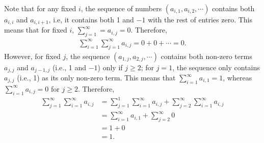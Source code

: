 \documentclass[12pt]{article}
\begin{document}
\begin{fproof}[3(a)]
 Note that for any fixed \(i\), the sequence of numbers \((a_{i,1}, a_{i,2}, \cdots)\) contains both \(a_{i,i}\) and \(a_{i,i+1}\), i.e, it contains both 1 and \(-1\) with the rest of entries zero.
 This means that for fixed \(i\), \(\sum_{j=1}^{\infty} = a_{i,j} = 0\).
 Therefore,
 \begin{align*}
    \sum_{i=1}^{\infty} \sum_{j=1}^{\infty} a_{i,j} = 0 + 0 + \cdots = 0.
 \end{align*}
 However, for fixed \(j\), the sequence \((a_{1,j}, a_{2,j}, \cdots)\) contains both non-zero terms \(a_{j,j}\) and \(a_{j-1,j}\) (i.e., 1 and \(-1\)) only if \(j \geq 2\); for \(j =1\), the sequence only contains \(a_{j,j}\) (i.e., 1) as its only non-zero term.
 This means that \(\sum_{i=1}^{\infty}a_{i,1} = 1\), whereas \(\sum_{i=1}^{\infty} a_{i,j} = 0\) for \(j \geq 2\).
 Therefore,
 \begin{align*}
    \sum_{j=1}^{\infty} \sum_{i=1}^{\infty} a_{i,j} 
    &= \sum_{j=1}^{1} \sum_{i=1}^{\infty} a_{i,j} + \sum_{j=2}^{\infty} \sum_{i=1}^{\infty} a_{i,j}\\
    &=\sum_{i=1}^{\infty} a_{i,1} + \sum_{j=2}^{\infty} 0\\
    &= 1 + 0\\
    & = 1.
 \end{align*}
\end{fproof}

\begin{fproof}[3(b)]
 
\end{fproof}

\begin{fproof}[3(c)]

\end{fproof}
\newpage
\end{document}
